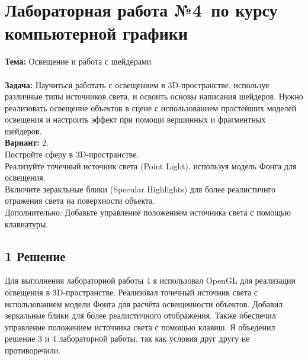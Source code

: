\documentclass[12pt]{article}
\begin{document}




\section*{Лабораторная работа №4\, по курсу компьютерной графики}

\textbf{Тема:} Освещение и работа с шейдерами\\
\\
\textbf{Задача:} Научиться работать с освещением в 3D-пространстве, используя различные типы источников света, и освоить основы написания шейдеров. 
Нужно реализовать освещение объектов в сцене с использованием простейших моделей освещения и настроить эффект при помощи вершинных и фрагментных шейдеров.\\
\textbf{Вариант:} 2. \\
Постройте сферу в 3D-пространстве.\\
Реализуйте точечный источник света (Point Light), используя модель Фонга для освещения.\\
Включите зеракльные блики (Specular Highlights) для более реалистичнго отражения света на поверхности объекта.\\
Дополнительно: Добавьте управление положением источника света с помощью клавиатуры.\\

\subsection*{1 Решение}
Для выполнения лабораторной работы 4 я использовал OpenGL для реализации освещения в 3D-пространстве. 
Реализовал точечный источник света с использованием модели Фонга для расчёта освещенности объектов. 
Добавил зеркальные блики для более реалистичного отображения. 
Также обеспечил управление положением источника света с помощью клавиш.
Я объеденил решение 3 и 4 лабораторной работы, так как условия друг другу не противоречили.
\end{document}
